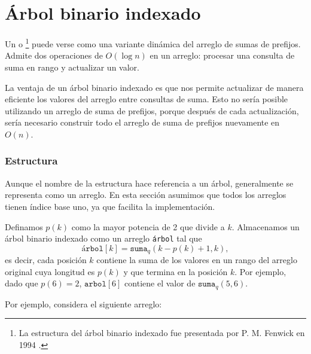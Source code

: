 \section{Árbol binario indexado}


Un  o \footnote{La
    estructura del árbol binario indexado fue presentada por P. M. Fenwick en 1994 \cite{fen94}.}
puede verse como una variante dinámica del arreglo de sumas de prefijos.
Admite dos operaciones de $O(\log n)$ en un arreglo:
procesar una consulta de suma en rango y actualizar un valor.

La ventaja de un árbol binario indexado es
que nos permite actualizar de manera eficiente
los valores del arreglo entre consultas de suma.
Esto no sería posible utilizando un arreglo de suma de prefijos,
porque después de cada actualización, sería necesario construir todo
el arreglo de suma de prefijos nuevamente en $O(n)$.

\subsubsection{Estructura}

Aunque el nombre de la estructura hace referencia a un árbol,
generalmente se representa como un arreglo.
En esta sección asumimos que todos los arreglos tienen índice base uno,
ya que facilita la implementación.

Definamos $p(k)$ como la mayor potencia de 2 que
divide a $k$.
Almacenamos un árbol binario indexado como un arreglo \texttt{árbol}
tal que
\[ \texttt{árbol}[k] = \texttt{suma}_q(k-p(k)+1,k),\]
es decir, cada posición $k$ contiene la suma de los valores
en un rango del arreglo original cuya longitud es $p(k)$
y que termina en la posición $k$.
Por ejemplo, dado que $p(6)=2$, $\texttt{arbol}[6]$
contiene el valor de $\texttt{suma}_q(5,6)$.

Por ejemplo, considera el siguiente arreglo:
\begin{center}
\end{center}

